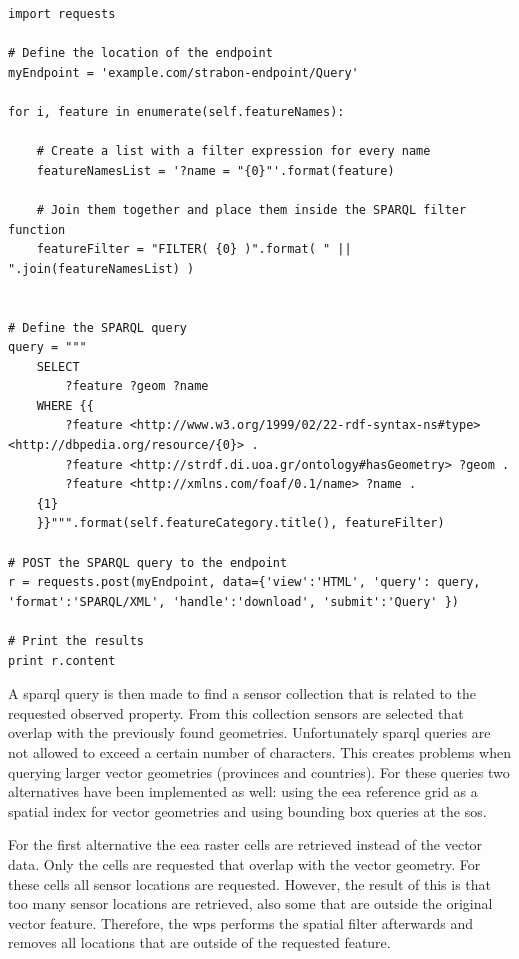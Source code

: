 \begin{lstlisting}[float,caption={Example script that sends a SPARQL query for retreiving geometries of input features}, label={lst:getGeometries}]
import requests 

# Define the location of the endpoint
myEndpoint = 'example.com/strabon-endpoint/Query'

for i, feature in enumerate(self.featureNames):
	
	# Create a list with a filter expression for every name 
	featureNamesList = '?name = "{0}"'.format(feature)
	
	# Join them together and place them inside the SPARQL filter function
	featureFilter = "FILTER( {0} )".format( " || ".join(featureNamesList) )


# Define the SPARQL query
query = """
	SELECT 
		?feature ?geom ?name
	WHERE {{ 
		?feature <http://www.w3.org/1999/02/22-rdf-syntax-ns#type> <http://dbpedia.org/resource/{0}> . 
		?feature <http://strdf.di.uoa.gr/ontology#hasGeometry> ?geom . 
		?feature <http://xmlns.com/foaf/0.1/name> ?name . 
	{1}
	}}""".format(self.featureCategory.title(), featureFilter)

# POST the SPARQL query to the endpoint
r = requests.post(myEndpoint, data={'view':'HTML', 'query': query, 'format':'SPARQL/XML', 'handle':'download', 'submit':'Query' }) 

# Print the results
print r.content
\end{lstlisting}

A \ac{sparql} query is then made to find a sensor collection that is related to the requested observed property. From this collection sensors are selected that overlap with the previously found geometries. Unfortunately \ac{sparql} queries are not allowed to exceed a certain number of characters. This creates problems when querying larger vector geometries (provinces and countries). For these queries two alternatives have been implemented as well: using the \ac{eea} reference grid as a spatial index for vector geometries and using bounding box queries at the \ac{sos}. 

For the first alternative the \ac{eea} raster cells are retrieved instead of the vector data. Only the cells are requested that overlap with the vector geometry. For these cells all sensor locations are requested. However, the result of this is that too many sensor locations are retrieved, also some that are outside the original vector feature. Therefore, the \ac{wps} performs the spatial filter afterwards and removes all locations that are outside of the requested feature. 

